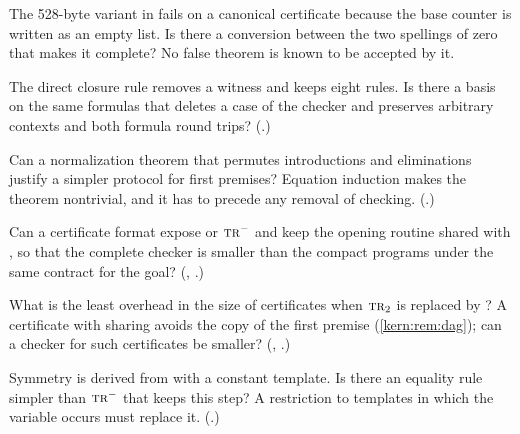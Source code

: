 \begin{question}
\label{kern:q:countervec}
The 528-byte variant in  fails on a canonical
certificate because the base counter is written as an empty list.  Is there
a conversion between the two spellings of zero that makes it complete?  No
false theorem is known to be accepted by it.
\end{question}

\begin{question}
\label{kern:q:deletecase}
The direct closure rule removes a witness and keeps eight rules.  Is there a
basis on the same formulas that deletes a case of the checker and preserves
arbitrary contexts and both formula round trips?
(.)
\end{question}

\begin{question}
\label{kern:q:focused}
Can a normalization theorem that permutes introductions and eliminations
justify a simpler protocol for first premises?  Equation induction makes the
theorem nontrivial, and it has to precede any removal of checking.
(.)
\end{question}

\begin{question}
\label{kern:q:compactone}
Can a certificate format expose  or $\rulename{Tr}^{-}$ and
keep the opening routine shared with , so that the complete
checker is smaller than the compact programs under the same contract for
the goal?  (, .)
\end{question}

\begin{question}
\label{kern:q:dag}
What is the least overhead in the size of certificates when
$\rulename{Tr}_{2}$ is replaced by ?  A certificate with
sharing avoids the copy of the first premise (\cref{kern:rem:dag}); can a
checker for such certificates be smaller?  (,
.)
\end{question}

\begin{question}
\label{kern:q:constant}
Symmetry is derived from  with a constant template.  Is there
an equality rule simpler than $\rulename{Tr}^{-}$ that keeps this step?  A
restriction to templates in which the variable occurs must replace it.
(.)
\end{question}

